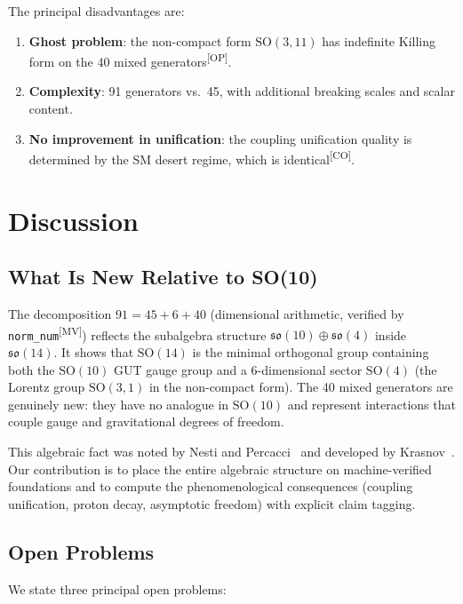 \documentclass[aps,prd,twocolumn,showpacs,preprintnumbers,superscriptaddress,floatfix]{revtex4-2}
\newcommand{\so}{\mathfrak{so}}
\newcommand{\MV}{\textsuperscript{[MV]}}
\newcommand{\CO}{\textsuperscript{[CO]}}
\newcommand{\OP}{\textsuperscript{[OP]}}
\begin{document}
The principal disadvantages are:
\begin{enumerate}
\item \textbf{Ghost problem}: the non-compact form $\mathrm{SO}(3,11)$
  has indefinite Killing form on the 40 mixed generators\OP.
\item \textbf{Complexity}: 91 generators vs.\ 45, with additional
  breaking scales and scalar content.
\item \textbf{No improvement in unification}: the coupling unification
  quality is determined by the SM desert regime, which is identical\CO.
\end{enumerate}

\section{Discussion}
\label{sec:discussion}

\subsection{What Is New Relative to SO(10)}

The decomposition $91 = 45 + 6 + 40$ (dimensional arithmetic, verified by \texttt{norm\_num}\MV) reflects the subalgebra structure $\so(10) \oplus \so(4)$ inside $\so(14)$.  It shows that $\mathrm{SO}(14)$ is the minimal orthogonal
group containing both the $\mathrm{SO}(10)$ GUT gauge group and a
6-dimensional sector $\mathrm{SO}(4)$ (the Lorentz group $\mathrm{SO}(3,1)$ in the non-compact form).
The 40 mixed generators are genuinely new: they have no analogue in
$\mathrm{SO}(10)$ and represent interactions that couple gauge and
gravitational degrees of freedom.

This algebraic fact was noted by Nesti and
Percacci~\cite{nesti2007,nesti2010} and developed by
Krasnov~\cite{krasnov2018,krasnov2022}.  Our contribution is to
place the entire algebraic structure on machine-verified foundations
and to compute the phenomenological consequences (coupling
unification, proton decay, asymptotic freedom) with explicit
claim tagging.

\subsection{Open Problems}

We state three principal open problems:
\end{document}
